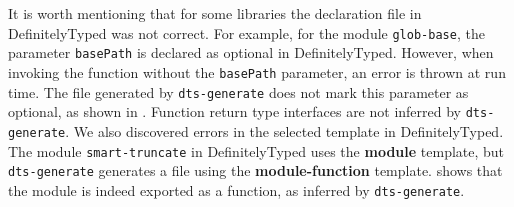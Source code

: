 \documentclass[sigconf]{acmart}
\begin{document}
It is worth mentioning that for some libraries the declaration file in DefinitelyTyped was
not correct. For example, for the module \texttt{glob-base}, the parameter
\texttt{basePath} is declared as optional in DefinitelyTyped. However, when invoking the
function without the \texttt{basePath} parameter, an error is thrown at run time. The file generated by
\texttt{dts-generate} does not mark this parameter as optional, as shown in
. Function return type interfaces are
not inferred by \texttt{dts-generate}.
We also
discovered errors in the selected template in DefinitelyTyped. The module
\texttt{smart-truncate} in DefinitelyTyped uses the \textbf{module} template, but
\texttt{dts-generate} generates a file using the \textbf{module-function}
template.  shows that the module is indeed
exported as a function, as inferred by \texttt{dts-generate}.
\end{document}
